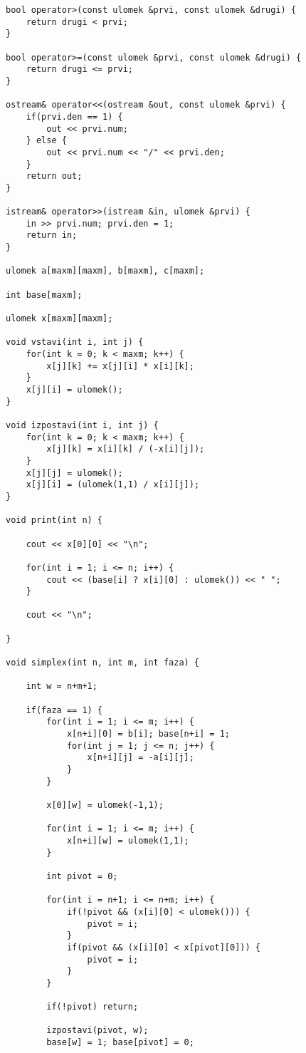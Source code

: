 \documentclass{article}
\begin{document}
\begin{enumerate}[label=\alph*)]
\begin{lstlisting}
bool operator>(const ulomek &prvi, const ulomek &drugi) {
    return drugi < prvi;
}

bool operator>=(const ulomek &prvi, const ulomek &drugi) {
    return drugi <= prvi;
}

ostream& operator<<(ostream &out, const ulomek &prvi) {
    if(prvi.den == 1) {
        out << prvi.num;
    } else {
        out << prvi.num << "/" << prvi.den;
    }
    return out;
}

istream& operator>>(istream &in, ulomek &prvi) {
    in >> prvi.num; prvi.den = 1;
    return in;
}

ulomek a[maxm][maxm], b[maxm], c[maxm];

int base[maxm];

ulomek x[maxm][maxm];

void vstavi(int i, int j) {
    for(int k = 0; k < maxm; k++) {
        x[j][k] += x[j][i] * x[i][k];
    }
    x[j][i] = ulomek();
}

void izpostavi(int i, int j) {
    for(int k = 0; k < maxm; k++) {
        x[j][k] = x[i][k] / (-x[i][j]);
    }
    x[j][j] = ulomek();
    x[j][i] = (ulomek(1,1) / x[i][j]);
}

void print(int n) {

    cout << x[0][0] << "\n";

    for(int i = 1; i <= n; i++) {
        cout << (base[i] ? x[i][0] : ulomek()) << " ";
    }

    cout << "\n";

}

void simplex(int n, int m, int faza) {

    int w = n+m+1;

    if(faza == 1) {
        for(int i = 1; i <= m; i++) {
            x[n+i][0] = b[i]; base[n+i] = 1;
            for(int j = 1; j <= n; j++) {
                x[n+i][j] = -a[i][j];
            }
        }

        x[0][w] = ulomek(-1,1);

        for(int i = 1; i <= m; i++) {
            x[n+i][w] = ulomek(1,1);
        }

        int pivot = 0;

        for(int i = n+1; i <= n+m; i++) {
            if(!pivot && (x[i][0] < ulomek())) {
                pivot = i;
            }
            if(pivot && (x[i][0] < x[pivot][0])) {
                pivot = i;
            }
        }

        if(!pivot) return;

        izpostavi(pivot, w);
        base[w] = 1; base[pivot] = 0;


\end{lstlisting}
\end{enumerate}
\end{document}
